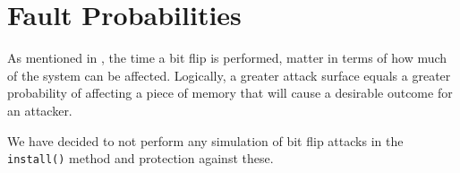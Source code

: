 \section{Fault Probabilities}
As mentioned in , the time a bit flip is performed, matter in terms of how much of the system can be affected. Logically, a greater attack surface equals a greater probability of affecting a piece of memory that will cause a desirable outcome for an attacker.


We have decided to not perform any simulation of bit flip attacks in the \texttt{install()} method and protection against these. 
